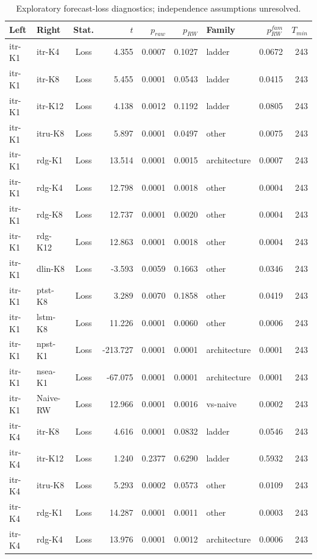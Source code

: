 \begin{table}[!t]
\centering
\caption{Exploratory forecast-loss diagnostics; independence assumptions unresolved.}
\label{tab:dm}
\begin{tabular}{llcrrrlrr}
\toprule
Left & Right & Stat. & $t$ & $p_{raw}$ & $p_{RW}$ & Family & $p_{RW}^{fam}$ & $T_{min}$ \\
\midrule
itr-K1 & itr-K4 & Loss & 4.355 & 0.0007 & 0.1027 & ladder & 0.0672 & 243 \\
itr-K1 & itr-K8 & Loss & 5.455 & 0.0001 & 0.0543 & ladder & 0.0415 & 243 \\
itr-K1 & itr-K12 & Loss & 4.138 & 0.0012 & 0.1192 & ladder & 0.0805 & 243 \\
itr-K1 & itru-K8 & Loss & 5.897 & 0.0001 & 0.0497 & other & 0.0075 & 243 \\
itr-K1 & rdg-K1 & Loss & 13.514 & 0.0001 & 0.0015 & architecture & 0.0007 & 243 \\
itr-K1 & rdg-K4 & Loss & 12.798 & 0.0001 & 0.0018 & other & 0.0004 & 243 \\
itr-K1 & rdg-K8 & Loss & 12.737 & 0.0001 & 0.0020 & other & 0.0004 & 243 \\
itr-K1 & rdg-K12 & Loss & 12.863 & 0.0001 & 0.0018 & other & 0.0004 & 243 \\
itr-K1 & dlin-K8 & Loss & -3.593 & 0.0059 & 0.1663 & other & 0.0346 & 243 \\
itr-K1 & ptst-K8 & Loss & 3.289 & 0.0070 & 0.1858 & other & 0.0419 & 243 \\
itr-K1 & lstm-K8 & Loss & 11.226 & 0.0001 & 0.0060 & other & 0.0006 & 243 \\
itr-K1 & npst-K1 & Loss & -213.727 & 0.0001 & 0.0001 & architecture & 0.0001 & 243 \\
itr-K1 & nsea-K1 & Loss & -67.075 & 0.0001 & 0.0001 & architecture & 0.0001 & 243 \\
itr-K1 & Naive-RW & Loss & 12.966 & 0.0001 & 0.0016 & vs-naive & 0.0002 & 243 \\
itr-K4 & itr-K8 & Loss & 4.616 & 0.0001 & 0.0832 & ladder & 0.0546 & 243 \\
itr-K4 & itr-K12 & Loss & 1.240 & 0.2377 & 0.6290 & ladder & 0.5932 & 243 \\
itr-K4 & itru-K8 & Loss & 5.293 & 0.0002 & 0.0573 & other & 0.0109 & 243 \\
itr-K4 & rdg-K1 & Loss & 14.287 & 0.0001 & 0.0011 & other & 0.0003 & 243 \\
itr-K4 & rdg-K4 & Loss & 13.976 & 0.0001 & 0.0012 & architecture & 0.0006 & 243 \\

\end{tabular}
\end{table}
